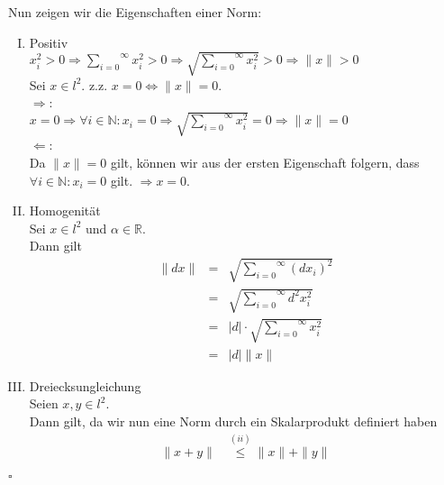 Nun zeigen wir die Eigenschaften einer Norm:

\begin{enumerate}[I)]
    \item Positiv\\
        $x_i^2 > 0 \Rightarrow \overset{\infty}{\underset{i = 0}{\sum}} x_i^2 > 0 \Rightarrow \sqrt{\overset{\infty}{\underset{i = 0}{\sum}} x_i^2} > 0 \Rightarrow \| x \| > 0$\\
        Sei $x \in l^2$. z.z. $x = 0 \Leftrightarrow \| x \| = 0$.\\
        $\Rightarrow$:\\
        $x = 0 \Rightarrow \forall i \in \mathbb{N} : x_i = 0 \Rightarrow \sqrt{\overset{\infty}{\underset{i = 0}{\sum}} x_i^2} = 0 \Rightarrow \| x \| = 0$\\
        $\Leftarrow$:\\
        Da $\| x \| = 0$ gilt, können wir aus der ersten Eigenschaft folgern, dass $\forall i \in \mathbb{N} : x_i = 0$ gilt.
        $\Rightarrow x = 0$.
    \item Homogenität\\
        Sei $x \in l^2$ und $\alpha \in \mathbb{R}$.\\
        Dann gilt
        $$\begin{array}{rcl}
            \| d x \|   &=& \sqrt{\overset{\infty}{\underset{i = 0}{\sum}} (dx_i)^2}\\
                        &=& \sqrt{\overset{\infty}{\underset{i = 0}{\sum}} d^2 x_i^2}\\
                        &=& |d| \cdot \sqrt{\overset{\infty}{\underset{i = 0}{\sum}} x_i^2}\\
                        &=& |d| \| x \|
        \end{array}$$
    \item Dreiecksungleichung\\
        Seien $x, y \in l^2$.\\
        Dann gilt, da wir nun eine Norm durch ein Skalarprodukt definiert haben
        $$\begin{array}{rcl}
            \| x + y \| &\stackrel{(ii)}{\leq} \| x \| + \| y \|
        \end{array}$$
 
\end{enumerate}
\mbox{}\hfill$\square$
